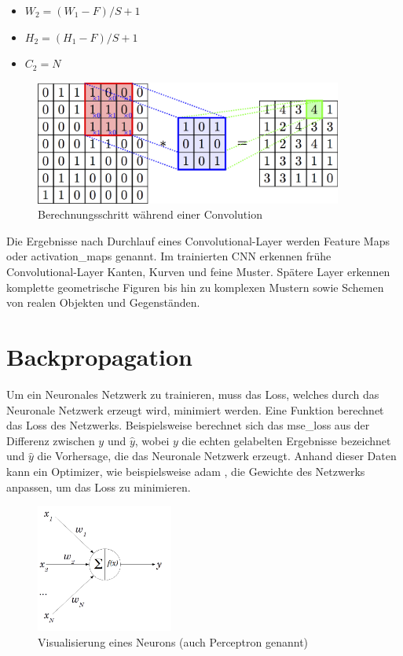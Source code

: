 \begin{itemize}
	\item $ W_2 = (W_1 - F) / S + 1 $
	\item $ H_2 = (H_1 - F) / S + 1 $
	\item $ C_2 = N $
\end{itemize}

\begin{figure}[H]
	\centering
	\includegraphics[width=0.90\textwidth]{resources/content/cnn/convolution_croped.png}
	\caption{Berechnungsschritt während einer Convolution \cite{convolution_img}}
	\label{img:convolution_img}
\end{figure}

Die Ergebnisse nach Durchlauf eines Convolutional-Layer werden Feature Maps oder \gls{activation_map}s genannt. Im trainierten CNN erkennen frühe Convolutional-Layer Kanten, Kurven und feine Muster. Spätere Layer erkennen komplette geometrische Figuren bis hin zu komplexen Mustern sowie Schemen von realen Objekten und Gegenständen.

\section{Backpropagation}
\label{sec:backpropagation}

Um ein Neuronales Netzwerk zu trainieren, muss das Loss, welches durch das Neuronale Netzwerk erzeugt wird, minimiert werden. Eine Funktion berechnet das Loss des Netzwerks. Beispielsweise berechnet sich das \gls{mse_loss} aus der Differenz zwischen $ y $ und $ \hat{y} $, wobei $ y $ die echten gelabelten Ergebnisse bezeichnet und $ \hat{y} $ die Vorhersage, die das Neuronale Netzwerk erzeugt.
Anhand dieser Daten kann ein Optimizer, wie beispielsweise \gls{adam} \cite{kingma2015adam}, die Gewichte des Netzwerks anpassen, um das Loss zu minimieren.

\begin{figure}[H]
	\centering
	\includegraphics[width=0.4\textwidth]{resources/content/perceptron.png}
	\caption{Visualisierung eines Neurons (auch Perceptron \cite{80230} genannt) \cite{perceptron_img}}
	\label{img:perceptron_img}
\end{figure}

